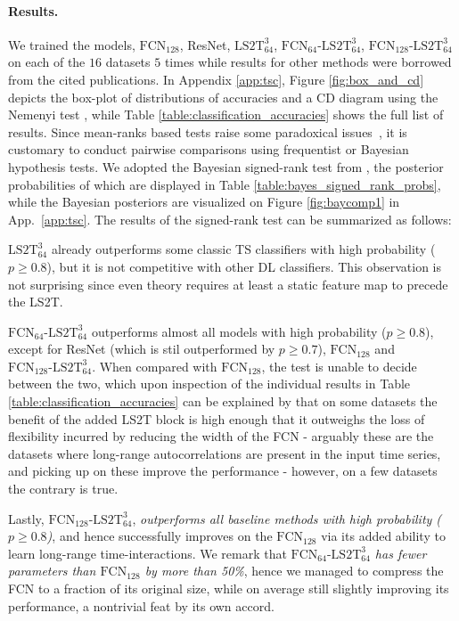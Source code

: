 \documentclass{article} \usepackage{iclr2021_conference,times}
\newcommand{\FCN}[1]{\ensuremath{\text{FCN}_{#1}}}
\newcommand{\LStwoTwidth}[2]{\ensuremath{\text{LS2T}_{#1}^{#2}}}
\newcommand{\FCNLStwoTwidth}[3]{\ensuremath{\text{FCN}_{#1}\text{-}\text{LS2T}_{#2}^{#3}}}
\theoremstyle{plain}
\theoremstyle{definition}
\begin{document}
\paragraph{Results.}
We trained the models, \FCN{128}, ResNet, \LStwoTwidth{64}{3}, \FCNLStwoTwidth{64}{64}{3}, \FCNLStwoTwidth{128}{64}{3} on each of the $16$ datasets $5$ times while results for other methods were borrowed from the cited publications. In Appendix \ref{app:tsc}, Figure \ref{fig:box_and_cd} depicts the box-plot of distributions of accuracies and a CD diagram using the Nemenyi test \citep{nemenyi1963distribution}, while Table \ref{table:classification_accuracies} shows the full list of results.
Since mean-ranks based tests raise some paradoxical issues~\citep{Benavoli2016}, it is customary to conduct pairwise comparisons using frequentist \citep{demvsar2006statistical} or Bayesian \citep{benavoli2017time} hypothesis tests. We adopted the Bayesian signed-rank test from \citet{benavoli2014bayesian}, the posterior probabilities of which are displayed in Table \ref{table:bayes_signed_rank_probs}, while the Bayesian posteriors are visualized on Figure \ref{fig:baycomp1} in App.~\ref{app:tsc}. The results of the signed-rank test can be summarized as follows: \begin{enumerate*}[label=(\arabic*)] \item \LStwoTwidth{64}{3} already outperforms some classic TS classifiers with high probability ($p \geq 0.8$), but it is not competitive with other DL classifiers.  This observation is not surprising since even theory requires at least a static feature map to precede the LS2T. \item \FCNLStwoTwidth{64}{64}{3} outperforms almost all models with high probability ($p \geq 0.8$), except for ResNet (which is stil outperformed by $p \geq 0.7$), \FCN{128} and \FCNLStwoTwidth{128}{64}{3}. When compared with \FCN{128}, the test is unable to decide between the two, which upon inspection of the individual results in Table \ref{table:classification_accuracies} can be explained by that on some datasets the benefit of the added LS2T block is high enough that it outweighs the loss of flexibility incurred by reducing the width of the FCN - arguably these are the datasets where long-range autocorrelations are present in the input time series, and picking up on these improve the performance - however, on a few datasets the contrary is true. \item Lastly, \FCNLStwoTwidth{128}{64}{3}, \emph{outperforms all baseline methods with high probability ($p \geq 0.8$)}, and hence successfully improves on the \FCN{128} via its added ability to learn long-range time-interactions.
We remark that \emph{\FCNLStwoTwidth{64}{64}{3} has fewer parameters than \FCN{128} by more than 50\%}, hence we managed to compress the FCN to a fraction of its original size, while on average still slightly improving its performance, a nontrivial feat by its own accord.
\end{enumerate*}
\end{document}
